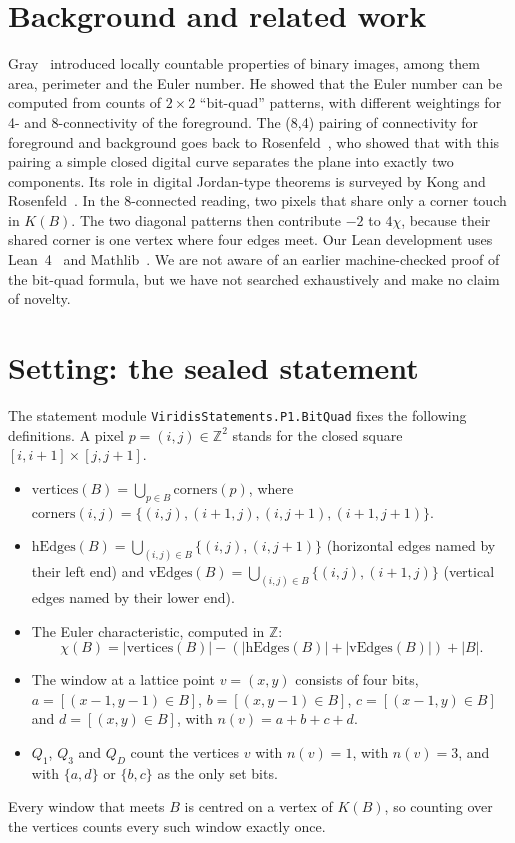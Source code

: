 \documentclass[11pt]{article}
\theoremstyle{definition}
\theoremstyle{remark}
\begin{document}
\section{Background and related work}

Gray~\cite{Gray1971} introduced locally countable properties of binary images,
among them area, perimeter and the Euler number. He showed that the Euler number
can be computed from counts of $2\times2$ ``bit-quad'' patterns, with different
weightings for 4- and 8-connectivity of the foreground. The (8,4) pairing of
connectivity for foreground and background goes back to
Rosenfeld~\cite{Rosenfeld1970}, who showed that with this pairing a simple closed
digital curve separates the plane into exactly two components. Its role in
digital Jordan-type theorems is surveyed by Kong and
Rosenfeld~\cite{KongRosenfeld1989}.
In the 8-connected reading, two pixels that share only a corner touch in $K(B)$.
The two diagonal patterns then contribute $-2$ to $4\chi$, because their
shared corner is one vertex where four edges meet. Our Lean development uses
Lean~4~\cite{Lean4} and Mathlib~\cite{Mathlib2020}. We are not aware of an
earlier machine-checked proof of the bit-quad formula, but we have not searched
exhaustively and make no claim of novelty.

\section{Setting: the sealed statement}\label{sec:l1start}

The statement module \texttt{ViridisStatements.P1.BitQuad} fixes the following
definitions. A pixel $p=(i,j)\in\mathbb{Z}^2$ stands for the closed square
$[i,i+1]\times[j,j+1]$.
\begin{itemize}
\item $\mathrm{vertices}(B)=\bigcup_{p\in B}\mathrm{corners}(p)$, where
  $\mathrm{corners}(i,j)=\{(i,j),(i+1,j),(i,j+1),(i+1,j+1)\}$.
\item $\mathrm{hEdges}(B)=\bigcup_{(i,j)\in B}\{(i,j),(i,j+1)\}$ (horizontal
  edges named by their left end) and
  $\mathrm{vEdges}(B)=\bigcup_{(i,j)\in B}\{(i,j),(i+1,j)\}$ (vertical edges named
  by their lower end).
\item The Euler characteristic, computed in $\mathbb{Z}$:
  \[\chi(B) = |\mathrm{vertices}(B)| - (|\mathrm{hEdges}(B)|+|\mathrm{vEdges}(B)|) + |B|.\]
\item The window at a lattice point $v=(x,y)$ consists of four bits,
  $a=[(x-1,y-1)\in B]$, $b=[(x,y-1)\in B]$, $c=[(x-1,y)\in B]$ and
  $d=[(x,y)\in B]$, with $n(v)=a+b+c+d$.
\item $Q_1$, $Q_3$ and $Q_D$ count the vertices $v$ with $n(v)=1$, with
  $n(v)=3$, and with $\{a,d\}$ or $\{b,c\}$ as the only set bits.
\end{itemize}
Every window that meets $B$ is centred on a vertex of $K(B)$, so counting over
the vertices counts every such window exactly once.
\end{document}
